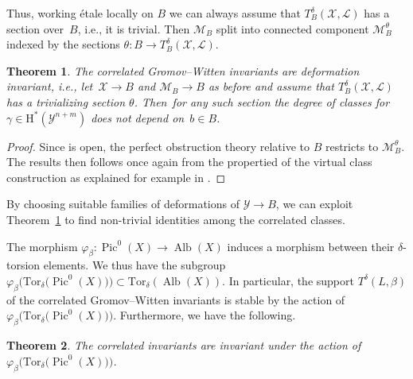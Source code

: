\documentclass[11pt]{article}
\numberwithin{equation}{section}
\newcommand{\Tor}{\mathrm{Tor}}
\newcommand{\vir}[1]{\big[#1\big]^\mathrm{vir}}
\newcommand{\ev}{\mathrm{ev}}
\newcommand{\Pic}{\operatorname{Pic}}
\newcommand{\Alb}{\operatorname{Alb}}
\newcommand{\bfw}{ {\boldsymbol w} }
\renewcommand{\L}{\mathcal{L}}
\newcommand{\M}{\mathcal{M}}
\newcommand{\X}{\mathcal{X}}
\newcommand{\Y}{\mathcal{Y}}
\numberwithin{equation}{section}
\newtheorem{theo}{Theorem}[section]
\theoremstyle{definition}
\begin{document}
Thus, working \'etale locally on $B$ we can always assume that
$T^\delta_B(\X,\L)$ has a section over~$B$, i.e., it is trivial. Then $\M_B$ split into connected component $\M_B^\theta$ indexed by the sections $\theta\colon B \to T^\delta_B(\X,\L)$.

\begin{theo}\label{thm:definvariants}
The correlated Gromov--Witten invariants are deformation invariant, i.e., let~${\X\to B}$ and $\M_B\to B$ as before and assume that $T^\delta_B(\X,\L)$ has a trivializing section $\theta$. Then~for any such section the degree of classes \smash{$\ev^*\gamma\cap\vir{\M_b^{\theta(b)}}$} for $\gamma\in\text{H}^*(\Y^{n+m})$ does not depend on~${b\in B}$.
\end{theo}

\begin{proof}
 Since \smash{$\M_B^\theta\to \M_B$} is open, the perfect obstruction theory  relative to $B$ restricts to $\M_B^\theta$. The results then follows once again from the propertied of the virtual class construction \cite{behrend1997intrinsic,manolache2012virtual} as explained for example in \cite[Appendix~A]{mandel2020descendant}.
\end{proof}

By choosing suitable families of deformations of $\Y\to B$, we can exploit Theorem~\ref{thm:definvariants} to find non-trivial identities among the correlated classes.

The morphism $\varphi_\beta\colon\Pic^0(X)\to\Alb(X)$ induces a morphism between their $\delta$-torsion elements. We thus have the subgroup $\varphi_\beta\bigl(\Tor_\delta\bigl(\Pic^0(X)\bigr)\bigr)\subset\Tor_\delta(\Alb(X))$. In particular, the support $T^\delta(L,\beta)$ of the correlated Gromov--Witten invariants is stable by the action of $\varphi_\beta\bigl(\Tor_\delta\bigl(\Pic^0(X)\bigr)\bigr)$. Furthermore, we have the following.

\begin{theo}\label{theo-torsor-invariance}
 The correlated invariants \smash{$\langle\langle\gamma_1,\dots,\gamma_m,\widetilde{\gamma}_1,\dots,\widetilde{\gamma}_n\rangle\rangle^\delta_{g,\beta,\bfw}$} are invariant under the action of $\varphi_\beta\bigl(\Tor_\delta\bigl(\Pic^0(X)\bigr)\bigr)$.
\end{theo}
\end{document}
